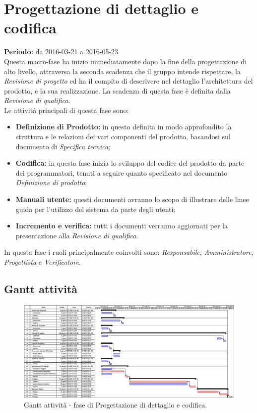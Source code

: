 \documentclass[a4paper]{report}
\begin{document}
		\section{Progettazione di dettaglio e codifica}
			\textbf{Periodo:} da 2016-03-21 a 2016-05-23 \\
			Questa macro-fase ha inizio immediatamente dopo la fine della progettazione di alto livello, attraversa la seconda 
			scadenza che il gruppo intende rispettare, la \emph{Revisione di progetto} ed ha il compito di descrivere nel dettaglio 
			l'architettura del prodotto, e la sua realizzazione. La scadenza di questa fase è definita dalla 
			\emph{Revisione di qualifica}. \\Le attività principali di questa fase sono:
			\begin{itemize}
				\item \textbf{Definizione di Prodotto:} in questo definita in modo approfondito la struttura e le relazioni 
				dei vari componenti del prodotto, basandosi sul documento di \emph{Specifica tecnica}; 
				\item \textbf{Codifica:} in questa fase inizia lo sviluppo del codice del prodotto da parte dei programmatori, 
				tenuti a seguire quanto specificato nel documento \emph{Definizione di prodotto};
				\item \textbf{Manuali utente:} questi documenti avranno lo scopo di illustrare delle linee guida per l'utilizzo 
				del sistema da parte degli utenti;
				\item \textbf{Incremento e verifica:} tutti i documenti verranno aggiornati per la presentazione alla 
				\emph{Revisione di qualifica}.
			\end{itemize}
			In questa fase i ruoli principalmente coinvolti sono: \emph{Responsabile}, \emph{Amministratore},
			\emph{Progettista} e \emph{Verificatore}.

			\subsection{Gantt attività}
				\begin{figure}[H]
					\centering
					\includegraphics[scale=0.4]{GanttCodifica}
					\caption{Gantt attività - fase di Progettazione di dettaglio e codifica.}
				\end{figure}
\end{document}
